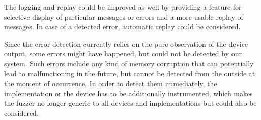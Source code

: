 The logging and replay could be improved as well by providing a feature for selective display of particular messages or errors and a more usable replay of messages. In case of a detected error, automatic replay could be considered.

Since the error detection currently relies on the pure observation of the device output, some errors might have happened, but could not be detected by our system. Such errors include any kind of memory corruption that can potentially lead to malfunctioning in the future, but cannot be detected from the outside at the moment of occurrence. In order to detect them immediately, the implementation or the device has to be additionally instrumented, which makes the fuzzer no longer generic to all devices and implementations but could also be considered.
